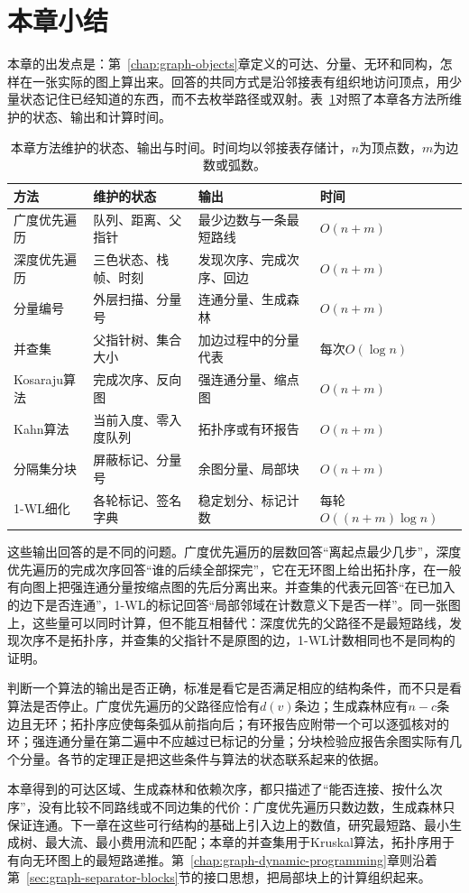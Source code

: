 \section{本章小结}
\label{sec:graph-traversal-summary}

本章的出发点是：第~\ref{chap:graph-objects}章定义的可达、分量、无环和同构，怎样在一张实际的图上算出来。回答的共同方式是沿邻接表有组织地访问顶点，用少量状态记住已经知道的东西，而不去枚举路径或双射。表~\ref{tab:graph-trav-summary}对照了本章各方法所维护的状态、输出和计算时间。

\begin{table}[!htb]
  \centering
  \caption{本章方法维护的状态、输出与时间。时间均以邻接表存储计，$n$为顶点数，$m$为边数或弧数。}
  \label{tab:graph-trav-summary}
  \small
  \begin{tabular}{@{}llll@{}}
    \toprule
    方法 & 维护的状态 & 输出 & 时间 \\
    \midrule
    广度优先遍历 & 队列、距离、父指针 & 最少边数与一条最短路线 & $O(n+m)$ \\
    深度优先遍历 & 三色状态、栈帧、时刻 & 发现次序、完成次序、回边 & $O(n+m)$ \\
    分量编号 & 外层扫描、分量号 & 连通分量、生成森林 & $O(n+m)$ \\
    并查集 & 父指针树、集合大小 & 加边过程中的分量代表 & 每次$O(\log n)$ \\
    Kosaraju算法 & 完成次序、反向图 & 强连通分量、缩点图 & $O(n+m)$ \\
    Kahn算法 & 当前入度、零入度队列 & 拓扑序或有环报告 & $O(n+m)$ \\
    分隔集分块 & 屏蔽标记、分量号 & 余图分量、局部块 & $O(n+m)$ \\
    1-WL细化 & 各轮标记、签名字典 & 稳定划分、标记计数 & 每轮$O((n+m)\log n)$ \\
    \bottomrule
  \end{tabular}
\end{table}

这些输出回答的是不同的问题。广度优先遍历的层数回答“离起点最少几步”，深度优先遍历的完成次序回答“谁的后续全部探完”，它在无环图上给出拓扑序，在一般有向图上把强连通分量按缩点图的先后分离出来。并查集的代表元回答“在已加入的边下是否连通”，1-WL的标记回答“局部邻域在计数意义下是否一样”。同一张图上，这些量可以同时计算，但不能互相替代：深度优先的父路径不是最短路线，发现次序不是拓扑序，并查集的父指针不是原图的边，1-WL计数相同也不是同构的证明。

判断一个算法的输出是否正确，标准是看它是否满足相应的结构条件，而不只是看算法是否停止。广度优先遍历的父路径应恰有$d(v)$条边；生成森林应有$n-c$条边且无环；拓扑序应使每条弧从前指向后；有环报告应附带一个可以逐弧核对的环；强连通分量在第二遍中不应越过已标记的分量；分块检验应报告余图实际有几个分量。各节的定理正是把这些条件与算法的状态联系起来的依据。

本章得到的可达区域、生成森林和依赖次序，都只描述了“能否连接、按什么次序”，没有比较不同路线或不同边集的代价：广度优先遍历只数边数，生成森林只保证连通。下一章在这些可行结构的基础上引入边上的数值，研究最短路、最小生成树、最大流、最小费用流和匹配；本章的并查集用于Kruskal算法，拓扑序用于有向无环图上的最短路递推。第~\ref{chap:graph-dynamic-programming}章则沿着第~\ref{sec:graph-separator-blocks}节的接口思想，把局部块上的计算组织起来。
